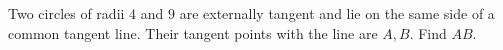 Two circles of radii $4$ and $9$ are externally tangent and lie on the same side of a common tangent line. Their tangent points with the line are $A,B$. Find $AB$.
